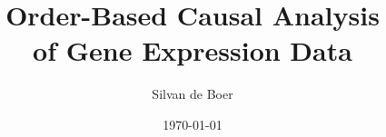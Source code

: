 \title[Order-Based Causal Analysis]{Order-Based Causal Analysis \\ of Gene Expression Data} %

\author{Silvan de Boer} %
\date{\today} %



\begin{frame}
    \titlepage 
\end{frame}